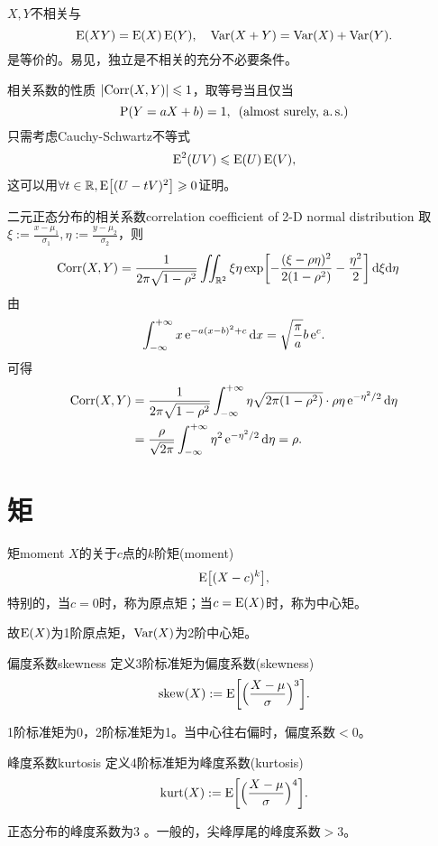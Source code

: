 $X,Y$不相关与
\[
	\E(XY)=\E(X)\E(Y),\quad\Var(X+Y)=\Var(X)+\Var(Y).
\]
是等价的。易见，独立是不相关的充分不必要条件。
\begin{theorem}{相关系数的性质}{}
	$\abs{\Corr(X,Y)}\leqslant 1$，取等号当且仅当
	\[
		\P(Y=aX+b)=1,\enspace(\text{almost~surely,~a.}\,\text{s.})
	\]
	只需考虑Cauchy-Schwartz不等式
	\begin{align}
		\E^2(UV)\leqslant\E(U)\E(V),
	\end{align}
	这可以用$\forall t\in\RR,\E\bigfkh{(U-tV)^2}\geqslant 0$证明。
\end{theorem}
\begin{example}{二元正态分布的相关系数}{correlation coefficient of 2-D normal distribution}
	取$\xi:=\frac{x-\mu_1}{\sigma_1},\eta:=\frac{y-\mu_2}{\sigma_2}$，则
	\begin{align*}
		\Corr(X,Y)%
		&=\frac1{2\pi\sqrt{1-\rho^2}}\iint_{\RR^2}\xi\eta\exp\biggfkh{-\frac{(\xi-\rho\eta)^2}{2(1-\rho^2)}-\frac{\eta^2}2}\d\xi\nd\eta
	\end{align*}
	由
	\[
		\int\iti x\e{-a(x-b)^2+c}\d x=\sqrt{\frac\pi{a}}b\e c.
	\]
	可得
	\begin{align*}
		\Corr(X,Y)&=\frac1{2\pi\sqrt{1-\rho^2}}\int\iti\eta\sqrt{2\pi(1-\rho^2)}\cdot\rho\eta\e{-\eta^2/2}\d\eta\\
		&=\frac\rho{\sqrt{2\pi}}\int\iti\eta^2\e{-\eta^2/2}\d\eta=\rho.
	\end{align*}
\end{example}
\section{矩}
\begin{definition}{矩}{moment}
	$X$的关于$c$点的$k$阶矩(moment)
	\begin{align}
		\E\bigfkh{(X-c)^k},
	\end{align}
	特别的，当$c=0$时，称为原点矩；当$c=\E(X)$时，称为中心矩。
\end{definition}
故$\E(X)$为1阶原点矩，$\Var(X)$为2阶中心矩。
\begin{definition}{偏度系数}{skewness}
	定义3阶标准矩为偏度系数(skewness)
	\begin{align}
		\mathrm{skew}(X):=\E\biggfkh{\Bigkh{\frac{X-\mu}\sigma}^3}.
	\end{align}
\end{definition}
1阶标准矩为0，2阶标准矩为1。当中心往右偏时，偏度系数$<0$。
\begin{definition}{峰度系数}{kurtosis}
	定义4阶标准矩为峰度系数(kurtosis)
	\begin{align}
		\mathrm{kurt}(X):=\E\biggfkh{\Bigkh{\frac{X-\mu}\sigma}^4}.
	\end{align}
\end{definition}
正态分布的峰度系数为3%
。一般的，尖峰厚尾的峰度系数$>3$。
